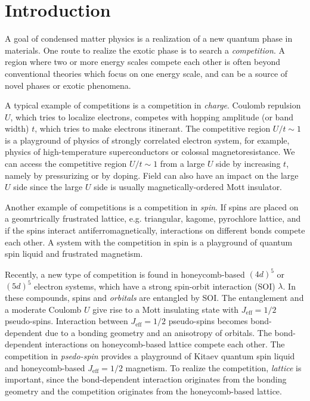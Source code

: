 \chapter{Introduction}
\label{introduction}
A goal of condensed matter physics is a realization of a new quantum phase in materials.
One route to realize the exotic phase is to search a \textit{competition}.
A region where two or more energy scales compete each other is often beyond conventional theories which focus on one energy scale, and can be a source of novel phases or exotic phenomena.

A typical example of competitions is a competition in \textit{charge}.
Coulomb repulsion $U$, which tries to localize electrons, competes with hopping amplitude (or band width) $t$, which tries to make electrons itinerant.
The competitive region $U/t \sim 1$ is a playground of physics of strongly correlated electron system, for example, physics of high-temperature superconductors or colossal magnetoresistance.
We can access the competitive region $U/t \sim 1$ from a large $U$ side by increasing $t$, namely by pressurizing or by doping.
Field can also have an impact on the large $U$ side since the large $U$ side is usually magnetically-ordered Mott insulator.

Another example of competitions is a competition in \textit{spin}.
If spins are placed on a geomrtrically frustrated lattice, e.g. triangular, kagome, pyrochlore lattice, and if the spins interact antiferromagnetically, interactions on different bonds compete each other.
A system with the competition in spin is a playground of quantum spin liquid and frustrated magnetism.

Recently, a new type of competition is found in honeycomb-based $(4d)^5$ or $(5d)^5$ electron systems, which have a strong spin-orbit interaction (SOI) $\lambda$.
In these compounds, spins and \textit{orbitals} are entangled by SOI.
The entanglement and a moderate Coulomb $U$ give rise to a Mott insulating state with $J_\mathrm{eff} = 1/2$ pseudo-spins.
Interaction between $J_\mathrm{eff} = 1/2$ pseudo-spins becomes bond-dependent due to a bonding geometry and an anisotropy of orbitals.
The bond-dependent interactions on honeycomb-based lattice compete each other.
The competition in \textit{psedo-spin} provides a playground of Kitaev quantum spin liquid and honeycomb-based $J_\mathrm{eff} = 1/2$ magnetism.
To realize the competition, \textit{lattice} is important, since the bond-dependent interaction originates from the bonding geometry and the competition originates from the honeycomb-based lattice.

